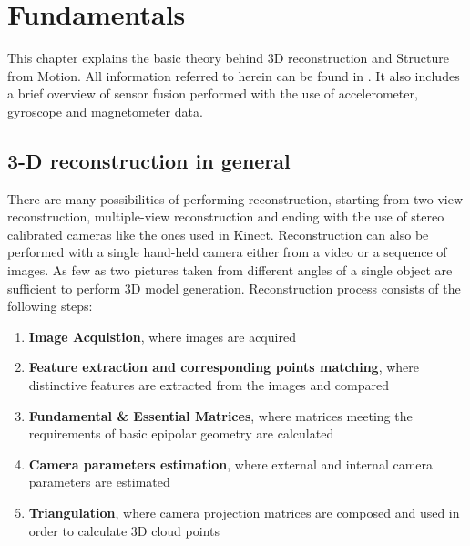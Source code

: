 \ifpdf
    \graphicspath{{figures/}{figures/comparisons}}
\else
    \graphicspath{{figures/}{figures/comparisons}}
\fi


\chapter{Fundamentals} %
This chapter explains the basic theory behind 3D reconstruction and Structure from Motion. All information referred to herein can be found in \cite{HartleyMultipleView}. It also includes a brief overview of sensor fusion performed with the use of accelerometer, gyroscope and magnetometer data. 

\section{3-D reconstruction in general}
There are many possibilities of performing reconstruction, starting from two-view reconstruction, multiple-view reconstruction and ending with the use of stereo calibrated cameras like the ones used in Kinect\cite{website:kinect}. Reconstruction can also be performed with a single hand-held camera either from a video or a sequence of images. As few as two pictures taken from different angles of a single object are sufficient to perform 3D model generation. Reconstruction process consists of the following steps:
\begin{enumerate}
\item \textbf{Image Acquistion}, where images are acquired 
\item \textbf{Feature extraction and corresponding points matching}, where distinctive features are extracted from the images and compared
\item \textbf{Fundamental \& Essential Matrices}, where matrices meeting the requirements of basic epipolar geometry are calculated
\item \textbf{Camera parameters estimation}, where external and internal camera parameters are estimated
\item \textbf{Triangulation}, where camera projection matrices are composed and used in order to calculate 3D cloud points
\end{enumerate}
